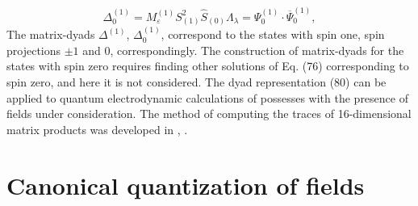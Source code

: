 \documentclass[a4paper,12pt]{article}
\begin{document}
\begin{equation}
\label{80}
\end{equation}
\vspace{-7mm}
\[
\Delta _0^{(1)}=M^{(1)}_\varepsilon S_{(1)}^2 \widehat{
S}_{(0)}\Lambda _\lambda =\Psi _0^{(1)}\cdot \overline{\Psi
}_0^{(1)} ,
\]
 The matrix-dyads $\Delta ^{(1)}$, $\Delta
_0^{(1)}$, correspond to the states with spin one, spin
projections $\pm 1$ and $0$, correspondingly. The construction of
matrix-dyads for the states with spin zero requires finding other
solutions of Eq. (76) corresponding to spin zero, and here it is
not considered. The dyad representation (80) can be applied to
quantum electrodynamic calculations of possesses with the presence
of fields under consideration. The method of computing the traces
of 16-dimensional matrix products was developed in
\cite{Kruglov1}, \cite{monogr}.

\section{Canonical quantization of fields}
\end{document}

